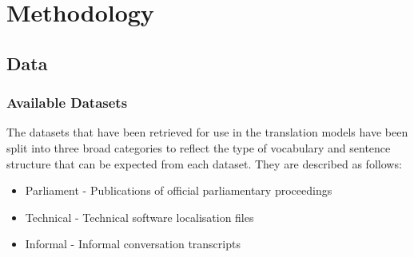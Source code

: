 \chapter{Methodology}

\section{Data}

\subsection{Available Datasets}


The datasets that have been retrieved for use in the translation models have been split into three broad categories to reflect the type of vocabulary and sentence structure that can be expected from each dataset. They are described as follows:

\begin{itemize}
    \item Parliament - Publications of official parliamentary proceedings
    \item Technical - Technical software localisation files
    \item Informal - Informal conversation transcripts
\end{itemize}


